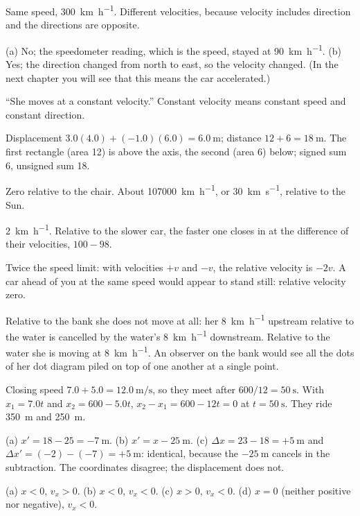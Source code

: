 \documentclass[11pt,twoside,openany]{book}
\begin{document}
\begin{description}[leftmargin=2.6em,itemsep=3pt,style=sameline]
  \item[1.55] Same speed, \SI{300}{\kilo\metre\per\hour}. Different velocities, because velocity includes direction and the directions are opposite.
  \item[1.56] (a) No; the speedometer reading, which is the speed, stayed at \SI{90}{\kilo\metre\per\hour}. (b) Yes; the direction changed from north to east, so the velocity changed. (In the next chapter you will see that this means the car accelerated.)
  \item[1.57] ``She moves at a constant velocity.'' Constant velocity means constant speed and constant direction.
  \item[1.58] Displacement $3.0(4.0) + (-1.0)(6.0) = \SI{+6.0}{\metre}$; distance $12 + 6 = \SI{18}{\metre}$. The first rectangle (area \num{12}) is above the axis, the second (area \num{6}) below; signed sum \num{6}, unsigned sum \num{18}.
  \item[1.59] Zero relative to the chair. About \SI{107000}{\kilo\metre\per\hour}, or \SI{30}{\kilo\metre\per\second}, relative to the Sun.
  \item[1.60] \SI{2}{\kilo\metre\per\hour}. Relative to the slower car, the faster one closes in at the difference of their velocities, $100 - 98$.
  \item[1.61] Twice the speed limit: with velocities $+v$ and $-v$, the relative velocity is $-2v$. A car ahead of you at the same speed would appear to stand still: relative velocity zero.
  \item[1.62] Relative to the bank she does not move at all: her \SI{8}{\kilo\metre\per\hour} upstream relative to the water is cancelled by the water's \SI{8}{\kilo\metre\per\hour} downstream. Relative to the water she is moving at \SI{8}{\kilo\metre\per\hour}. An observer on the bank would see all the dots of her dot diagram piled on top of one another at a single point.
  \item[1.63] Closing speed $7.0 + 5.0 = \SI{12.0}{\metre\per\second}$, so they meet after $600/12 = \SI{50}{\second}$. With $x_1 = 7.0t$ and $x_2 = 600 - 5.0t$, $x_2 - x_1 = 600 - 12t = 0$ at $t = \SI{50}{\second}$. They ride \SI{350}{\metre} and \SI{250}{\metre}.
  \item[1.64] (a) $x' = 18 - 25 = \SI{-7}{\metre}$. (b) $x' = x - \SI{25}{\metre}$. (c) $\Delta x = 23 - 18 = +\SI{5}{\metre}$ and $\Delta x' = (-2) - (-7) = +\SI{5}{\metre}$: identical, because the $-\SI{25}{\metre}$ cancels in the subtraction. The coordinates disagree; the displacement does not.
  \item[1.65] (a) $x<0$, $v_x>0$. (b) $x<0$, $v_x<0$. (c) $x>0$, $v_x<0$. (d) $x=0$ (neither positive nor negative), $v_x<0$.

\end{description}
\end{document}
